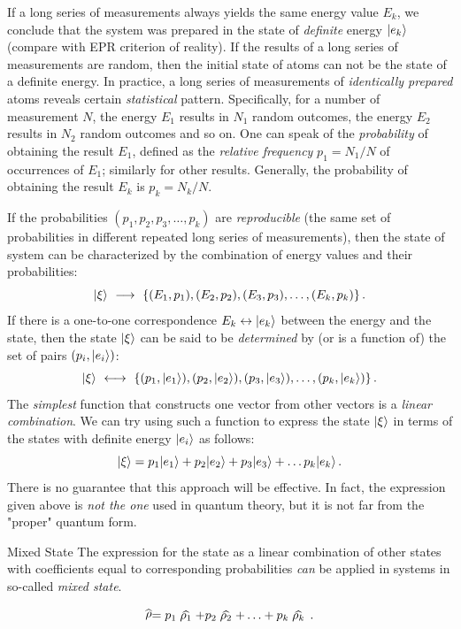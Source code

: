 If a long series of measurements always yields the same energy value $E_k$, we conclude that the system was prepared in the state of \emph{definite} energy $|{e_k}\rangle$ (compare with EPR criterion of reality). If the results of a long series of measurements are random, then the initial state of atoms can not be the state of a definite energy. In practice, a long series of measurements of \emph{identically prepared} atoms reveals certain \emph{statistical} pattern. Specifically, for a number of measurement $N$, the energy $E_1$ results in $N_1$ random outcomes, the energy $E_2$ results in $N_2$ random outcomes and so on. One can speak of the \emph{probability} of obtaining the result $E_1$, defined as the \emph{relative frequency} $p_1=N_1/N$ of occurrences of $E_1$; similarly for other results. Generally, the probability of obtaining the result $E_k$ is $p_k=N_k/N$. 

If the probabilities $(p_1, p_2, p_3,\ldots, p_k)$ are
 \emph{reproducible} (the same set of probabilities in different repeated long series of measurements), then the state of system can be characterized by the combination of energy values and their probabilities:
 \[
 |{\xi}\rangle\,\,\longrightarrow\,\, \lbrace(E_1, p_1), (E_2, p_2), (E_3, p_3), \ldots, (E_k, p_k)\rbrace\,.
 \]
If there is a one-to-one correspondence $E_k\leftrightarrow|{e_k}\rangle$ between the energy and the state, then the state $|{\xi}\rangle$ can be said to be \emph{determined} by (or is a function of) the set of pairs $(p_i,|{e_i}\rangle)$:
\[
|{\xi}\rangle\,\,\longleftrightarrow\,\, \lbrace(p_1, |{e_1}\rangle), (p_2, |{e_2}\rangle), (p_3, |{e_3}\rangle), \ldots, (p_k, |{e_k}\rangle)\rbrace\,.
\]
The \emph{simplest} function that constructs one vector from other vectors is a \emph{linear combination}. We can try using such a function to express the state $|{\xi}\rangle$ in terms of the states with definite energy $|{e_i}\rangle$ as follows:
\[
|{\xi}\rangle = p_1|{e_1}\rangle+p_2|{e_2}\rangle+p_3|{e_3}\rangle+\ldots p_k|{e_k}\rangle\,.
\]
There is no guarantee that this approach will be effective. In fact, the expression given above is \emph{not the one} used in quantum theory, but it is not far from the "proper" quantum form. 
\begin{mybio}{Mixed State}
	The expression for the state as a linear combination of other states with coefficients equal to corresponding probabilities \emph{can} be applied in systems in so-called \emph{mixed state}.
	
	\[
		\op{\rho} = p_1\op{\rho_1}+ p_2\op{\rho_2}+\ldots+ p_k\op{\rho_k}\,.
	\]
\end{mybio}

